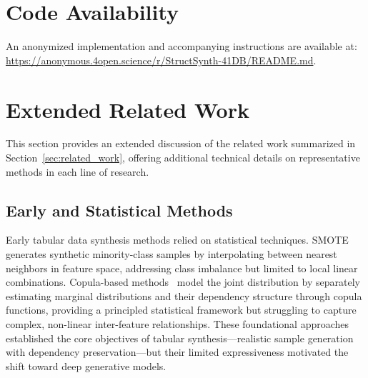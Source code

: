 
\section{Code Availability}
\label{app:code_availability}

An anonymized implementation and accompanying instructions are available at:
\url{https://anonymous.4open.science/r/StructSynth-41DB/README.md}.

\section{Extended Related Work}
\label{app:extended_related_work}

This section provides an extended discussion of the related work summarized in Section~\ref{sec:related_work}, offering additional technical details on representative methods in each line of research.

\subsection{Early and Statistical Methods}
Early tabular data synthesis methods relied on statistical techniques. SMOTE~\cite{chawla2002smote} generates synthetic minority-class samples by interpolating between nearest neighbors in feature space, addressing class imbalance but limited to local linear combinations. Copula-based methods~\cite{xue2000multivariate} model the joint distribution by separately estimating marginal distributions and their dependency structure through copula functions, providing a principled statistical framework but struggling to capture complex, non-linear inter-feature relationships. These foundational approaches established the core objectives of tabular synthesis---realistic sample generation with dependency preservation---but their limited expressiveness motivated the shift toward deep generative models.

